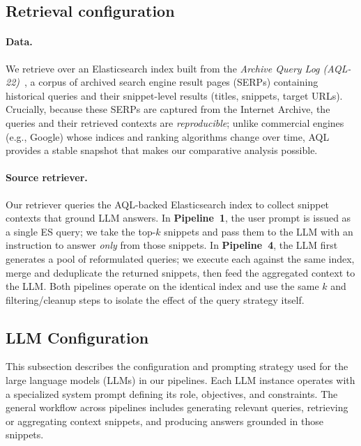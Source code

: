 \documentclass[manuscript,screen]{acmart}
\begin{document}
\begin{CCSXML}
	\subsection{Retrieval configuration}
	\label{subsec:retrieval-config}
	
	\paragraph{Data.}
	We retrieve over an Elasticsearch index built from the \emph{Archive Query Log (AQL-22)}~\citep{reimer:2023}, a corpus of archived search engine result pages (SERPs) containing historical queries and their snippet-level results (titles, snippets, target URLs). Crucially, because these SERPs are captured from the Internet Archive, the queries and their retrieved contexts are \emph{reproducible}; unlike commercial engines (e.g., Google) whose indices and ranking algorithms change over time, AQL provides a stable snapshot that makes our comparative analysis possible.
	
	\paragraph{Source retriever.}
	Our retriever queries the AQL-backed Elasticsearch index to collect snippet contexts that ground LLM answers. In \textbf{Pipeline~1}, the user prompt is issued as a single ES query; we take the top-$k$ snippets and pass them to the LLM with an instruction to answer \emph{only} from those snippets. In \textbf{Pipeline~4}, the LLM first generates a pool of reformulated queries; we execute each against the same index, merge and deduplicate the returned snippets, then feed the aggregated context to the LLM. Both pipelines operate on the identical index and use the same $k$ and filtering/cleanup steps to isolate the effect of the query strategy itself.
	
	\subsection{LLM Configuration}
	\label{subsec:llm-config}
	
	This subsection describes the configuration and prompting strategy used for the large language models (LLMs) in our pipelines. Each LLM instance operates with a specialized system prompt defining its role, objectives, and constraints. The general workflow across pipelines includes generating relevant queries, retrieving or aggregating context snippets, and producing answers grounded in those snippets.
	

\end{CCSXML}
\end{document}
